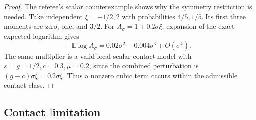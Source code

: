 \begin{proof}
The referee's scalar counterexample shows why the symmetry restriction is needed. Take independent \(\xi=-1/2,2\) with probabilities \(4/5,1/5\). Its first three moments are zero, one, and \(3/2\). For \(A_\sigma=1+0.2\sigma\xi\), expansion of the exact expected logarithm gives
\[
 -\mathbb E\log A_\sigma=0.02\sigma^2-0.004\sigma^3+O(\sigma^4).
\]
The same multiplier is a valid local scalar contact model with \(s=g=1/2,c=0.3,\mu=0.2\), since the combined perturbation is \((g-c)\sigma\xi=0.2\sigma\xi\). Thus a nonzero cubic term occurs within the admissible contact class.
\end{proof}

\subsection{Contact limitation}\label{app:mech-contact}
